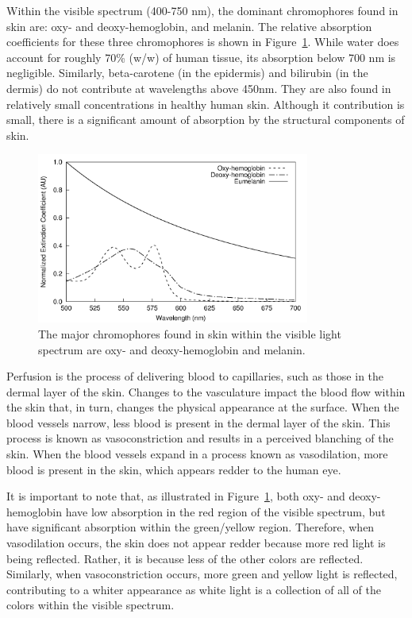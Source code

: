 Within the visible spectrum (400-750 nm), the dominant chromophores found in skin are: oxy- and deoxy-hemoglobin, and melanin. The relative absorption coefficients for these three chromophores is shown in Figure~\ref{fig:intro-skin_chromophores}. While water does account for roughly 70\% (w/w) of human tissue,\cite{Nakagawa2010} its absorption below 700 nm is negligible. Similarly, beta-carotene (in the epidermis) and bilirubin (in the dermis) do not contribute at wavelengths above 450nm. They are also found in relatively small concentrations in healthy human skin. Although it contribution is small, there is a significant amount of absorption by the structural components of skin.\cite{Bargo2005}

\begin{figure}
	\centering \includegraphics[width=0.8\textwidth]{figures/intro-skin_chromophores.png}
	\caption[The major chromophores of skin within the visible light spectrum]{\label{fig:intro-skin_chromophores}The major chromophores found in skin within the visible light spectrum are oxy- and deoxy-hemoglobin and melanin.}
\end{figure}

Perfusion is the process of delivering blood to capillaries, such as those in the dermal layer of the skin. Changes to the vasculature impact the blood flow within the skin that, in turn, changes the physical appearance at the surface. When the blood vessels narrow, less blood is present in the dermal layer of the skin. This process is known as vasoconstriction and results in a perceived blanching of the skin. When the blood vessels expand in a process known as vasodilation, more blood is present in the skin, which appears redder to the human eye.

It is important to note that, as illustrated in Figure~\ref{fig:intro-skin_chromophores}, both oxy- and deoxy-hemoglobin have low absorption in the red region of the visible spectrum, but have significant absorption within the green/yellow region. Therefore, when vasodilation occurs, the skin does not appear redder because more red light is being reflected. Rather, it is because less of the other colors are reflected. Similarly, when vasoconstriction occurs, more green and yellow light is reflected, contributing to a whiter appearance as white light is a collection of all of the colors within the visible spectrum.

